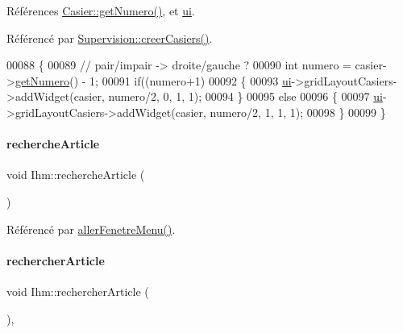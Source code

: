 Références \hyperlink{_casier_8cpp_source_l00060}{Casier\+::get\+Numero()}, et \hyperlink{_ihm_8h_source_l00099}{ui}.



Référencé par \hyperlink{_supervision_8cpp_source_l00090}{Supervision\+::creer\+Casiers()}.


\begin{DoxyCode}
00088 \{
00089     \textcolor{comment}{// pair/impair -> droite/gauche ?}
00090     \textcolor{keywordtype}{int} numero = casier->\hyperlink{class_casier_a061b024a2733a5bb1dfcc43bb0022707}{getNumero}() - 1;
00091     \textcolor{keywordflow}{if}((numero+1)%
00092     \{
00093         \hyperlink{class_ihm_a0ac5f47856566ceeeca1720109bf70ea}{ui}->gridLayoutCasiers->addWidget(casier, numero/2, 0, 1, 1);
00094     \}
00095     \textcolor{keywordflow}{else}
00096     \{
00097         \hyperlink{class_ihm_a0ac5f47856566ceeeca1720109bf70ea}{ui}->gridLayoutCasiers->addWidget(casier, numero/2, 1, 1, 1);
00098     \}
00099 \}
\end{DoxyCode}
\mbox{\label{class_ihm_a3805ec42b0de42e9210b9561b08f3ecd}} 
\paragraph{\texorpdfstring{recherche\+Article}{rechercheArticle}}
{\footnotesize\ttfamily void Ihm\+::recherche\+Article (\begin{DoxyParamCaption}\item[{Q\+String}]{ }\end{DoxyParamCaption})\hspace{0.3cm}{\ttfamily [signal]}}



Référencé par \hyperlink{_ihm_8cpp_source_l00190}{aller\+Fenetre\+Menu()}.

\mbox{\label{class_ihm_a03b67c17f7bd3b8b2ef8d095f460a6b9}} 
\paragraph{\texorpdfstring{rechercher\+Article}{rechercherArticle}}
{\footnotesize\ttfamily void Ihm\+::rechercher\+Article (\begin{DoxyParamCaption}{ }\end{DoxyParamCaption})\hspace{0.3cm}{\ttfamily [private]}, {\ttfamily [slot]}}



